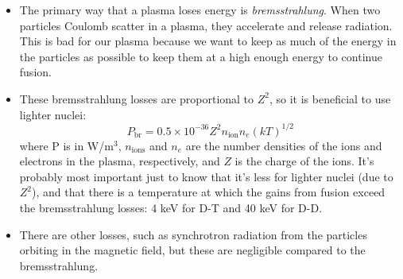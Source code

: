 \documentclass[letter]{article}
\begin{document}
\begin{itemize}
\item The primary way that a plasma loses energy is
  \textit{bremsstrahlung}. When two particles Coulomb scatter in a
  plasma, they accelerate and release radiation. This is bad for our
  plasma because we want to keep as much of the energy in the
  particles as possible to keep them at a high enough energy to
  continue fusion.~\cite[pp. 539]{krane}
\item These bremsstrahlung losses are proportional to $Z^2$, so it is
  beneficial to use lighter nuclei:
  \begin{equation*}
    P_{\text{br}}=0.5\times 10^{-36}Z^2n_{\text{ion}}n_e{(kT)}^{1/2}
  \end{equation*}
where P is in W/m$^3$, $n_{\text{ions}}$ and $n_e$ are the number
densities of the ions and electrons in the plasma, respectively, and $Z$ is the
charge of the ions. It's probably most important just to know that it's less
for lighter nuclei (due to $Z^2$), and that there is a temperature at which the gains
from fusion exceed the bremsstrahlung losses: 4 keV for D-T and 40 keV
for D-D.~\cite[pp. 540]{krane}
\item There are other losses, such as synchrotron radiation from the
  particles orbiting in the magnetic field, but these are negligible
  compared to the bremsstrahlung.~\cite[pp. 539]{krane}
\end{itemize}


\end{document}
